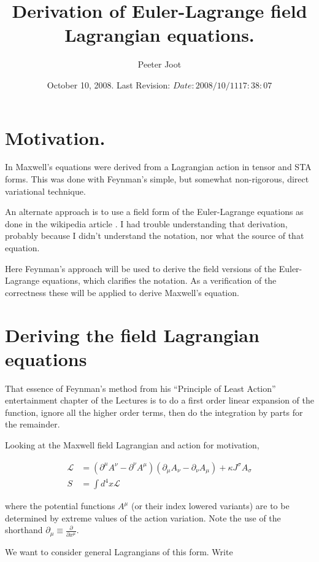 \documentclass{article}
\title{ Derivation of Euler-Lagrange field Lagrangian equations.}
\author{Peeter Joot}
\date{ October 10, 2008.  Last Revision: $Date: 2008/10/11 17:38:07 $ }
\newcommand{\LL}[0]{\mathcal{L}}
\newcommand{\PD}[2]{\frac{\partial {#2}}{\partial {#1}}}
\begin{document}
\maketitle{}

\tableofcontents

\section{ Motivation. }

In \cite{PJMaxwellLagrangian} Maxwell's equations were derived from
a Lagrangian action in tensor and STA forms.  This was done with 
Feynman's \cite{feynman1963flp} simple, but somewhat non-rigorous, direct variational technique.

An alternate approach is to use a field form of the Euler-Lagrange
equations as done in the wikipedia article \cite{wikiemtensor}.  I had
trouble understanding that derivation, probably because
I didn't understand the notation, nor what the source of that equation.

Here Feynman's approach will be used to derive the field versions of the Euler-Lagrange
equations, which clarifies the notation.  As a verification of the correctness these
will be applied to derive Maxwell's equation.

\section{ Deriving the field Lagrangian equations }

That essence of Feynman's method from his 
``Principle of Least Action'' entertainment chapter of the Lectures is
to do a first order linear expansion of the function, ignore all the higher order terms,
then do the integration by parts for the remainder.

Looking at the Maxwell field Lagrangian and action for motivation,

\begin{align*}
\LL &= (\partial^\mu A^\nu - \partial^\nu A^\mu) (\partial_\mu A_\nu - \partial_\nu A_\mu) + \kappa J^\sigma A_\sigma \\
S &= \int d^4 x \LL
\end{align*}

where the potential functions $A^\mu$ (or their index lowered variants)
are to be determined by extreme values of the action variation.  Note the use of the shorthand
$\partial_\mu \equiv \PD{x^\mu}{}$.

We want to consider general Lagrangians of this form.  Write
\end{document}
